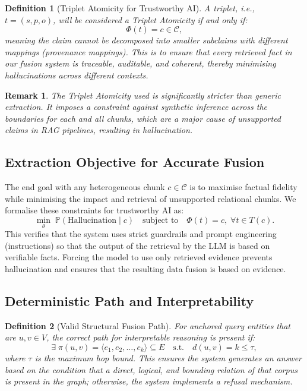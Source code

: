 \documentclass[conference]{IEEEtran}
\newtheorem{definition}{Definition}
\newtheorem{remark}{Remark}
\begin{document}
\begin{definition}[Triplet Atomicity for Trustworthy AI]
A triplet, i.e., $t = (s,p,o)$, will be considered a Triplet Atomicity if and only if:
\begin{equation}
  \Phi(t) = c \in \mathcal{C},
\end{equation}
meaning the claim cannot be decomposed into smaller subclaims with different mappings (provenance mappings). This is to ensure that every retrieved fact in our fusion system is traceable, auditable, and coherent, thereby minimising hallucinations across different contexts.
\end{definition}

\begin{remark}
The Triplet Atomicity used is significantly stricter than generic extraction. It imposes a constraint against synthetic inference across the boundaries for each and all chunks, which are a major cause of unsupported claims in RAG pipelines, resulting in hallucination.
\end{remark}

\subsection{Extraction Objective for Accurate Fusion}
The end goal with any heterogeneous chunk $c \in \mathcal{C}$ is to maximise factual fidelity while minimising the impact and retrieval of unsupported relational chunks. We formalise these constraints for trustworthy AI as:
\begin{equation}
  \min_{\theta} \; \mathbb{P}(\text{Hallucination} \mid c) \quad \text{subject to} \quad \Phi(t) = c, \; \forall t \in T(c).
\end{equation}
This verifies that the system uses strict guardrails and prompt engineering (instructions) so that the output of the retrieval by the LLM is based on verifiable facts. Forcing the model to use only retrieved evidence prevents hallucination and ensures that the resulting data fusion is based on evidence.

\subsection{Deterministic Path and Interpretability}
\begin{definition}[Valid Structural Fusion Path]
For anchored query entities that are $u, v \in V$, the correct path for interpretable reasoning is present if:
\begin{equation}
  \exists\; \pi(u, v) = \langle e_1, e_2, \ldots, e_k \rangle \subseteq E \quad \text{s.t.} \quad d(u, v) = k \leq \tau,
\end{equation}
where $\tau$ is the maximum hop bound. This ensures the system generates an answer based on the condition that a direct, logical, and bounding relation of that corpus is present in the graph; otherwise, the system implements a refusal mechanism.
\end{definition}
\end{document}
